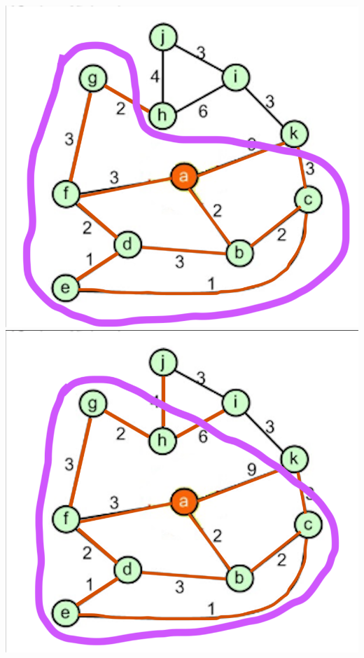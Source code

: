 \documentclass[a4paper]{exam}
\begin{document}
\begin{questions}
\begin{parts}
\begin{solution}
    \includegraphics[scale=0.2]{Q3/images3b/3b7}
    \includegraphics[scale=0.2]{Q3/images3b/3b8}

\end{solution}
\end{parts}
\end{questions}
\end{document}
